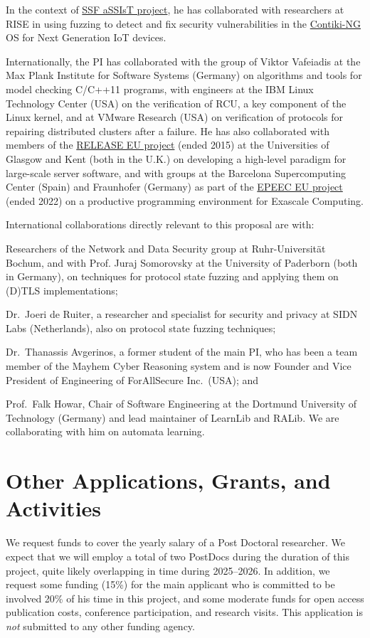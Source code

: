 \documentclass[11pt]{article}
\begin{document}
In the context of \href{https://assist-project.github.io}{SSF aSSIsT project},
he has collaborated with researchers at RISE in using fuzzing to detect and
fix security vulnerabilities in the
\href{https://www.contiki-ng.org/}{Contiki-NG} OS for Next Generation IoT
devices.

Internationally, the PI has collaborated with the group of Viktor Vafeiadis at
the Max Plank Institute for Software Systems (Germany) on algorithms and tools
for model checking C/C++11 programs, with
engineers at the IBM Linux Technology Center (USA) on the verification of
RCU, a key component of the Linux kernel, and
at VMware Research (USA) on verification of protocols for repairing
distributed clusters after a failure.
%
He has also collaborated with members of the
\href{http://release-project.eu/}{RELEASE EU project} (ended 2015) at the
Universities of Glasgow and Kent (both in the U.K.) on developing a high-level
paradigm for large-scale server software, and with groups at the Barcelona
Supercomputing Center (Spain) and Fraunhofer (Germany) as part of the
\href{https://epeec-project.eu/}{EPEEC EU project} (ended 2022) on a
productive programming environment for Exascale Computing.

International collaborations directly relevant to this proposal are with:
\begin{inparaenum}[(1)]
\item Researchers of the Network and Data Security group at Ruhr-Universit\"at
  Bochum, and with Prof. Juraj Somorovsky at the University of Paderborn (both
  in Germany), on techniques for protocol state fuzzing and applying them on
  (D)TLS implementations;
\item Dr.~Joeri de Ruiter, a researcher and specialist for security and
  privacy at SIDN Labs (Netherlands), also on protocol state fuzzing
  techniques;
\item Dr.~Thanassis Avgerinos, a former student of the main PI, who has been a
  team member of the Mayhem Cyber Reasoning system and is now Founder and Vice
  President of Engineering of ForAllSecure Inc.\ (USA); and
\item Prof.~Falk Howar, Chair of Software Engineering at the Dortmund
  University of Technology (Germany) and lead maintainer of LearnLib and RALib.
  We are collaborating with him on automata learning.
\end{inparaenum}

\section{Other Applications, Grants, and Activities}
We request funds to cover the yearly salary of a Post Doctoral researcher.
We expect that we will employ a total of two PostDocs during the duration of
this project, quite likely overlapping in time during 2025--2026.
%
In addition, we request some funding (15\%) for the main applicant who is
committed to be involved 20\% of his time in this project, and some moderate
funds for open access publication costs, conference participation, and
research visits.
%
This application is \emph{not} submitted to any other funding agency.
\end{document}
